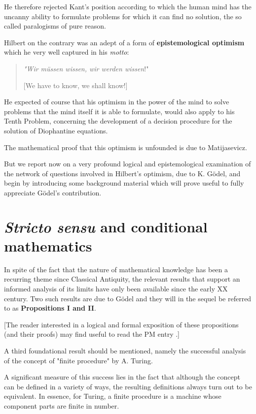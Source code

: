\documentclass[12pt]{article}
\begin{document}
He therefore rejected Kant's position according to which the human mind has the uncanny ability to formulate problems for which it can find no solution, the so called paralogisms of pure reason.

Hilbert on the contrary was an adept of a form of \textbf{epistemological optimism} which he very well captured in his \emph{motto}:

\begin{quote}
\emph{"Wir m\"{u}ssen wissen, wir werden wissen}!"

[We have to know, we shall know!]
\end{quote}

He expected of course that his optimism in the power of the mind to solve problems that the mind itself it is able to formulate, would also apply to his Tenth Problem, concerning the development of a decision procedure for the solution of Diophantine equations.

The mathematical proof that this optimism is unfounded is due to Matijasevicz.

But we report now on a very profound logical and epistemological examination of the network of questions involved in Hilbert's optimism, due to K. G\"odel, and begin by introducing some background material which will prove useful to  fully appreciate G\"odel's contribution.

\section{\emph{Stricto sensu} and conditional mathematics}\normalsize

In spite of the fact that the nature of mathematical knowledge has been a recurring theme since Classical Antiquity, the relevant results that support an informed analysis of its limits have only been available since the early XX century. Two such results are due to G\"odel and they will in the sequel be referred to as \textbf{Propositions I and II}.
  
[The reader interested in a logical and formal exposition of these propositions (and their proofs) may find useful to read the PM entry .]

A third foundational result should be mentioned, namely the successful analysis of the concept of "finite procedure" by A. Turing. 

A significant measure of this success lies in the fact that although the concept can be defined in a variety of ways, the resulting definitions always turn out to be equivalent. In essence, for Turing, a finite procedure is a machine whose component parts are finite in number.
\end{document}
